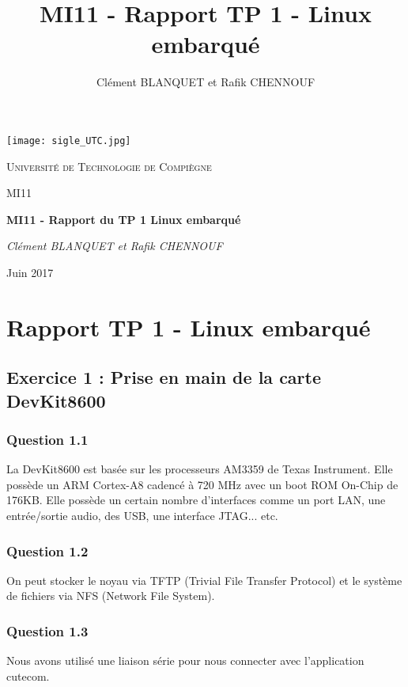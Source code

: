 \documentclass[a4paper,12pt]{report}
\author{Clément BLANQUET et Rafik CHENNOUF}
\title{MI11 - Rapport TP 1 - Linux embarqué}
\begin{document}
\begin{titlepage}

	\centering
	\texttt{[image: sigle\_UTC.jpg]}\par\vspace{1cm}
	{\scshape\LARGE Université de Technologie de Compiègne \par\vspace{1cm}}	
	{\scshape\Large MI11\par}
	\vspace{1.5cm}
	{\huge\bfseries MI11 - Rapport du TP 1 Linux embarqué\par}
	\vspace{2cm}
	{\Large\itshape Clément BLANQUET et Rafik CHENNOUF\par}
	\vspace{2cm}
	\vfill
	{\large Juin 2017}
\end{titlepage}


\renewcommand{\contentsname}{Sommaire} %
\tableofcontents
\listoffigures        %




\chapter{Rapport TP 1 - Linux embarqué}

\section{Exercice 1 : Prise en main de la carte DevKit8600}
\subsection{Question 1.1}
La DevKit8600 est basée sur les processeurs AM3359 de Texas Instrument. Elle possède un ARM Cortex-A8 cadencé à 720 MHz avec un boot ROM On-Chip de 176KB. Elle possède un certain nombre d'interfaces comme un port LAN, une entrée/sortie audio, des USB, une interface JTAG... etc.

\subsection{Question 1.2} 
On peut stocker le noyau via TFTP (Trivial File Transfer Protocol) et le système de fichiers via NFS (Network File System).

\subsection{Question 1.3}
Nous avons utilisé une liaison série pour nous connecter avec l'application cutecom.
\end{document}
